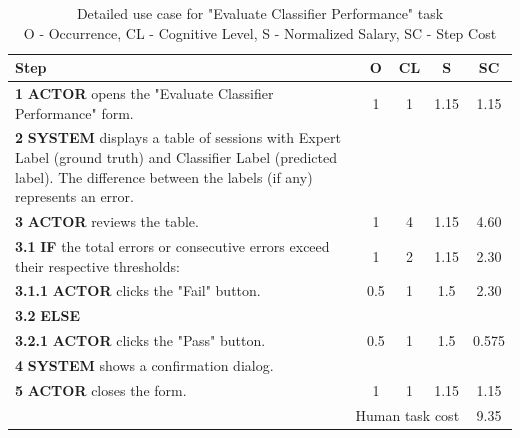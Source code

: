 \begin{table}[H]
    \centering
    \begin{tabularx}{\textwidth}{|X|c|c|c|c|}
    \hline
    \textbf{Step} & \textbf{O} & \textbf{CL} & \textbf{S} & \textbf{SC} \\
    \hline
    \textbf{1} \textbf{ACTOR} opens the "Evaluate Classifier Performance" form. & 1 & 1 & 1.15 & 1.15 \\
    \hline
    \textbf{2} \textbf{SYSTEM} displays a table of sessions with Expert Label (ground truth) and Classifier Label (predicted label). 
    The difference between the labels (if any) represents an error. & & & & \\
    \hline
    \textbf{3} \textbf{ACTOR} reviews the table. & 1 & 4 & 1.15 & 4.60\\
    \hline
    \textbf{3.1} \textbf{IF} the total errors or consecutive errors exceed their respective thresholds: & 1 & 2 & 1.15 & 2.30 \\
    \hline
    \textbf{3.1.1} \textbf{ACTOR} clicks the "Fail" button. &0.5 & 1& 1.5&2.30 \\
    \hline
    \textbf{3.2} \textbf{ELSE} & & & & \\
    \hline
    \textbf{3.2.1} \textbf{ACTOR} clicks the "Pass" button. &0.5 &1 & 1.5&0.575 \\
    \hline
    \textbf{4} \textbf{SYSTEM} shows a confirmation dialog. & & & & \\
    \hline
    \textbf{5} \textbf{ACTOR} closes the form. &1 &1 &1.15 & 1.15\\
    \hline
    \multicolumn{4}{|r|}{Human task cost} &9.35 \\
    \hline
    \end{tabularx}
    \caption{Detailed use case for "Evaluate Classifier Performance" task\\ 
    O - Occurrence, CL - Cognitive Level, S - Normalized Salary, SC - Step Cost}
    \label{table:evaluate_classifier_performance}
    \end{table}
    
    